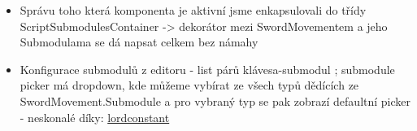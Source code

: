 \begin{itemize}
  \item Správu toho která komponenta je aktivní jsme enkapsulovali do třídy ScriptSubmodulesContainer -> dekorátor mezi SwordMovementem a jeho Submodulama se dá napsat celkem bez námahy
  \item Konfigurace submodulů z editoru - list párů klávesa-submodul ; submodule picker má dropdown, kde můžeme vybírat ze všech typů dědících ze SwordMovement.Submodule a pro vybraný typ se pak zobrazí defaultní picker - neskonalé díky: \href{https://github.com/lordconstant/SubclassPropertyDrawer}{lordconstant}
\end{itemize}



